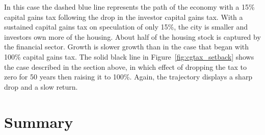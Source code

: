 In this case the dashed blue line represents the path of the economy with a 15\% capital gains tax following the drop in the investor capital gains tax. %
With a sustained capital gains tax on speculation of only 15\%, the city is smaller and investors own more of the housing. About half of the housing stock is captured by the financial sector. 
Growth is slower growth than in the case that began with 100\% capital gains tax. %
The solid black line in Figure~\ref{fig:cgtax_setback} shows the case described in the section above, in which effect of dropping the tax to zero for 50 years then raising it to 100\%. Again, the trajectory displays a sharp drop and a slow return. 







\section{Summary}


